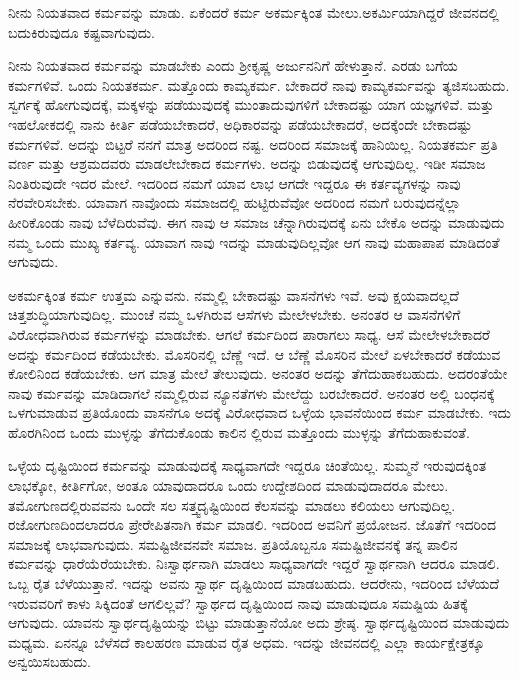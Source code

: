 \begin{artha}
ನೀನು ನಿಯತವಾದ ಕರ್ಮವನ್ನು ಮಾಡು. ಏಕೆಂದರೆ ಕರ್ಮ ಅಕರ್ಮಕ್ಕಿಂತ ಮೇಲು.\break ಅಕರ್ಮಿಯಾಗಿದ್ದರೆ ಜೀವನದಲ್ಲಿ ಬದುಕಿರುವುದೂ ಕಷ್ಟವಾಗುವುದು.
\end{artha}

ನೀನು ನಿಯತವಾದ ಕರ್ಮವನ್ನು ಮಾಡಬೇಕು ಎಂದು ಶ‍್ರೀಕೃಷ್ಣ ಅರ್ಜುನನಿಗೆ ಹೇಳುತ್ತಾನೆ. ಎರಡು ಬಗೆಯ ಕರ್ಮಗಳಿವೆ. ಒಂದು ನಿಯತಕರ್ಮ. ಮತ್ತೊಂದು ಕಾಮ್ಯಕರ್ಮ. ಬೇಕಾದರೆ ನಾವು ಕಾಮ್ಯಕರ್ಮವನ್ನು ತ್ಯಜಿಸಬಹುದು. ಸ್ವರ್ಗಕ್ಕೆ ಹೋಗುವುದಕ್ಕೆ, ಮಕ್ಕಳನ್ನು ಪಡೆಯುವುದಕ್ಕೆ ಮುಂತಾದುವುಗಳಿಗೆ ಬೇಕಾದಷ್ಟು ಯಾಗ ಯಜ್ಞಗಳಿವೆ. ಮತ್ತು ಇಹಲೋಕದಲ್ಲಿ ನಾನು ಕೀರ್ತಿ ಪಡೆಯಬೇಕಾದರೆ, ಅಧಿಕಾರವನ್ನು ಪಡೆಯಬೇಕಾದರೆ, ಅದಕ್ಕೆಂದೇ ಬೇಕಾದಷ್ಟು ಕರ್ಮಗಳಿವೆ. ಅದನ್ನು ಬಿಟ್ಟರೆ ನನಗೆ ಮಾತ್ರ ಅದರಿಂದ ನಷ್ಟ. ಅದರಿಂದ ಸಮಾಜಕ್ಕೆ ಹಾನಿಯಿಲ್ಲ. ನಿಯತಕರ್ಮ ಪ್ರತಿ ವರ್ಣ ಮತ್ತು ಆಶ್ರಮದವರು ಮಾಡಲೇಬೇಕಾದ ಕರ್ಮಗಳು. ಅದನ್ನು ಬಿಡುವುದಕ್ಕೆ ಆಗುವುದಿಲ್ಲ. ಇಡೀ ಸಮಾಜ ನಿಂತಿರುವುದೇ ಇದರ ಮೇಲೆ. ಇದರಿಂದ ನಮಗೆ ಯಾವ ಲಾಭ ಆಗದೇ ಇದ್ದರೂ ಈ ಕರ್ತವ್ಯಗಳನ್ನು ನಾವು ನೆರವೇರಿಸಬೇಕು. ಯಾವಾಗ ನಾವೊಂದು ಸಮಾಜದಲ್ಲಿ ಹುಟ್ಟಿರುವೆವೋ ಅದರಿಂದ ನಮಗೆ ಬರುವುದನ್ನೆಲ್ಲಾ ಹೀರಿಕೊಂಡು ನಾವು ಬೆಳೆದಿರುವೆವು. ಈಗ ನಾವು ಆ ಸಮಾಜ ಚೆನ್ನಾಗಿರುವುದಕ್ಕೆ ಏನು ಬೇಕೊ ಅದನ್ನು ಮಾಡುವುದು ನಮ್ಮ ಒಂದು ಮುಖ್ಯ ಕರ್ತವ್ಯ. ಯಾವಾಗ ನಾವು ಇದನ್ನು ಮಾಡುವುದಿಲ್ಲವೋ ಆಗ ನಾವು ಮಹಾಪಾಪ ಮಾಡಿದಂತೆ ಆಗುವುದು.

ಅಕರ್ಮಕ್ಕಿಂತ ಕರ್ಮ ಉತ್ತಮ ಎನ್ನುವನು. ನಮ್ಮಲ್ಲಿ ಬೇಕಾದಷ್ಟು ವಾಸನೆಗಳು ಇವೆ. ಅವು ಕ್ಷಯವಾದಲ್ಲದೆ ಚಿತ್ತಶುದ್ಧಿಯಾಗುವುದಿಲ್ಲ. ಮುಂಚೆ ನಮ್ಮ ಒಳಗಿರುವ ಆಸೆಗಳು ಮೇಲೇಳಬೇಕು. ಅನಂತರ ಆ ವಾಸನೆಗಳಿಗೆ ವಿರೋಧವಾಗಿರುವ ಕರ್ಮಗಳನ್ನು ಮಾಡಬೇಕು. ಆಗಲೆ ಕರ್ಮದಿಂದ ಪಾರಾಗಲು ಸಾಧ್ಯ. ಆಸೆ ಮೇಲೇಳಬೇಕಾದರೆ ಅದನ್ನು ಕರ್ಮದಿಂದ ಕಡೆಯಬೇಕು. ಮೊಸರಿನಲ್ಲಿ ಬೆಣ್ಣೆ ಇದೆ. ಆ ಬೆಣ್ಣೆ ಮೊಸರಿನ ಮೇಲೆ ಏಳಬೇಕಾದರೆ ಕಡೆಯುವ ಕೋಲಿನಿಂದ ಕಡೆಯಬೇಕು. ಆಗ ಮಾತ್ರ ಮೇಲೆ ತೇಲುವುದು. ಅನಂತರ ಅದನ್ನು ತೆಗೆದುಹಾಕಬಹುದು. ಅದರಂತೆಯೇ ನಾವು ಕರ್ಮವನ್ನು ಮಾಡಿದಾಗಲೆ ನಮ್ಮಲ್ಲಿರುವ ನ್ಯೂನತೆಗಳು ಮೇಲೆದ್ದು ಬರಬೇಕಾದರೆ. ಅನಂತರ ಅಲ್ಲಿ ಬಂಧನಕ್ಕೆ ಒಳಗುಮಾಡುವ ಪ್ರತಿಯೊಂದು ವಾಸನೆಗೂ ಅದಕ್ಕೆ ವಿರೋಧವಾದ ಒಳ್ಳೆಯ ಭಾವನೆಯಿಂದ ಕರ್ಮ ಮಾಡಬೇಕು. ಇದು ಹೊರಗಿನಿಂದ ಒಂದು ಮುಳ್ಳನ್ನು ತೆಗೆದುಕೊಂಡು ಕಾಲಿನ ಲ್ಲಿರುವ ಮತ್ತೊಂದು ಮುಳ್ಳನ್ನು ತೆಗೆದುಹಾಕುವಂತೆ.

ಒಳ್ಳೆಯ ದೃಷ್ಟಿಯಿಂದ ಕರ್ಮವನ್ನು ಮಾಡುವುದಕ್ಕೆ ಸಾಧ್ಯವಾಗದೇ ಇದ್ದರೂ ಚಿಂತೆಯಿಲ್ಲ. ಸುಮ್ಮನೆ ಇರುವುದಕ್ಕಿಂತ ಲಾಭಕ್ಕೋ, ಕೀರ್ತಿಗೋ, ಅಂತೂ ಯಾವುದಾದರೂ ಒಂದು ಉದ್ದೇಶದಿಂದ ಮಾಡುವುದಾದರೂ ಮೇಲು. ತಮೋಗುಣದಲ್ಲಿರುವವನು ಒಂದೇ ಸಲ ಸತ್ತ್ವದೃಷ್ಟಿಯಿಂದ ಕೆಲಸವನ್ನು ಮಾಡಲು ಕಲಿಯಲು ಆಗುವುದಿಲ್ಲ. ರಜೋಗುಣದಿಂದಲಾದರೂ ಪ್ರೇರೇಪಿತನಾಗಿ ಕರ್ಮ ಮಾಡಲಿ. ಇದರಿಂದ ಅವನಿಗೆ ಪ್ರಯೋಜನ. ಜೊತೆಗೆ ಇದರಿಂದ ಸಮಾಜಕ್ಕೆ ಲಾಭವಾಗುವುದು. ಸಮಷ್ಟಿಜೀವನವೇ ಸಮಾಜ. ಪ್ರತಿಯೊಬ್ಬನೂ ಸಮಷ್ಟಿಜೀವನಕ್ಕೆ ತನ್ನ ಪಾಲಿನ ಕರ್ಮವನ್ನು ಧಾರೆಯೆರೆಯಬೇಕು. ನಿಃಸ್ವಾರ್ಥನಾಗಿ ಮಾಡಲು ಸಾಧ್ಯವಾಗದೇ ಇದ್ದರೆ ಸ್ವಾರ್ಥನಾಗಿ ಆದರೂ ಮಾಡಲಿ. ಒಬ್ಬ ರೈತ ಬೆಳೆಯುತ್ತಾನೆ. ಇದನ್ನು ಅವನು ಸ್ವಾರ್ಥ ದೃಷ್ಟಿಯಿಂದ ಮಾಡಬಹುದು. ಆದರೇನು, ಇದರಿಂದ ಬೆಳೆಯದೆ ಇರುವವರಿಗೆ ಕಾಳು ಸಿಕ್ಕಿದಂತೆ ಆಗಲಿಲ್ಲವೆ? ಸ್ವಾರ್ಥದ ದೃಷ್ಟಿಯಿಂದ ನಾವು ಮಾಡುವುದೂ ಸಮಷ್ಟಿಯ ಹಿತಕ್ಕೆ ಆಗುವುದು. ಯಾವನು ಸ್ವಾರ್ಥದೃಷ್ಟಿಯನ್ನು ಬಿಟ್ಟು ಮಾಡುತ್ತಾನೆಯೋ ಅದು ಶ್ರೇಷ್ಠ. ಸ್ವಾರ್ಥದೃಷ್ಟಿಯಿಂದ ಮಾಡುವುದು ಮಧ್ಯಮ. ಏನನ್ನೂ ಬೆಳೆಸದೆ ಕಾಲಹರಣ ಮಾಡುವ ರೈತ ಅಧಮ. ಇದನ್ನು ಜೀವನದಲ್ಲಿ ಎಲ್ಲಾ ಕಾರ್ಯಕ್ಷೇತ್ರಕ್ಕೂ ಅನ್ವಯಿಸಬಹುದು.

